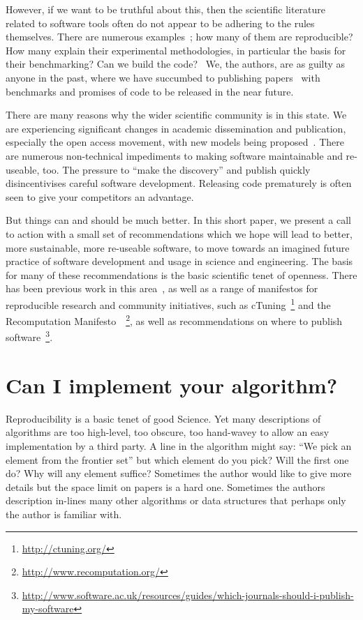 \documentclass[conference]{IEEEtran}
\begin{document}
However, if we want to be truthful about this, then the scientific
literature related to software tools often do not appear to be
adhering to the rules themselves. There are numerous
examples~\cite{beck-et-al:2005,prosser:2012}; how many of them are
reproducible? How many explain their experimental methodologies, in
particular the basis for their benchmarking? Can we build the
code?~\cite{collberg-et-al:2014} We, the authors, are as guilty as
anyone in the past, where we have succumbed to publishing
papers~\cite{crick-et-al:2009,Berdine2011SLAyer} with benchmarks and
promises of code to be released in the near future.

There are many reasons why the wider scientific community is in this
state. We are experiencing significant changes in academic
dissemination and publication, especially the open access movement,
with new models being
proposed~\cite{stodden-et-al:2013,fursin+dubach:2014}.  There are
numerous non-technical impediments to making software maintainable and
re-useable, too. The pressure to ``make the discovery'' and publish
quickly disincentivises careful software development. Releasing
code prematurely is often seen to give your competitors an advantage.

But things can and should be much better. In this short paper, we
present a call to action with a small set of recommendations which we
hope will lead to better, more sustainable, more re-useable software,
to move towards an imagined future practice of software development
and usage in science and engineering.  The basis for many of these
recommendations is the basic scientific tenet of openness. There has
been previous work in this
area~\cite{sim-et-al:2003,chirigati-et-al:2013}, as well as a range of
manifestos for reproducible research and community initiatives, such
as cTuning~\footnote{\url{http://ctuning.org/}} and the Recomputation
Manifesto~\cite{gent:2013}~\footnote{\url{http://www.recomputation.org/}},
as well as recommendations on where to publish
software~\footnote{\url{http://www.software.ac.uk/resources/guides/which-journals-should-i-publish-my-software}}.


\section{Can I implement your algorithm?}

Reproducibility is a basic tenet of good Science. Yet many
descriptions of algorithms are too high-level, too obscure, too
hand-wavey to allow an easy implementation by a third party. A line in
the algorithm might say: ``We pick an element from the frontier set''
but which element do you pick? Will the first one do? Why will any
element suffice? Sometimes the author would like to give more details
but the space limit on papers is a hard one. Sometimes the authors
description in-lines many other algorithms or data structures that
perhaps only the author is familiar with.
\end{document}
